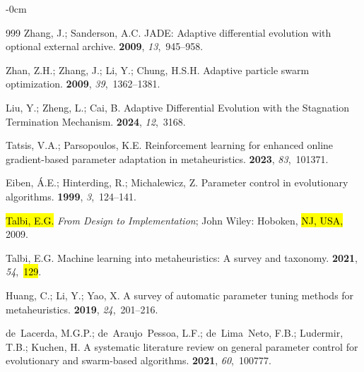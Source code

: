 \documentclass[mathematics,article,accept,moreauthors]{Definitions/mdpi}
\begin{document}
\begin{adjustwidth}{-\extralength}{0cm}
\begin{thebibliography}{999}
Zhang, J.; Sanderson, A.C.
\newblock JADE: Adaptive differential evolution with optional external archive.
 {\bf 2009}, {\em
  13},~945--958.

Zhan, Z.H.; Zhang, J.; Li, Y.; Chung, H.S.H.
\newblock Adaptive particle swarm optimization.
 {\bf 2009}, {\em 39},~1362--1381.

Liu, Y.; Zheng, L.; Cai, B.
\newblock Adaptive Differential Evolution with the Stagnation Termination
  Mechanism.
 {\bf 2024}, {\em 12},~3168.

Tatsis, V.A.; Parsopoulos, K.E.
\newblock Reinforcement learning for enhanced online gradient-based parameter
  adaptation in metaheuristics.
 {\bf 2023}, {\em
  83},~101371.

Eiben, {\'A}.E.; Hinterding, R.; Michalewicz, Z.
\newblock Parameter control in evolutionary algorithms.
 {\bf 1999}, {\em
  3},~124--141.

\hl{Talbi, E.G.} %
\newblock \textit{From Design to Implementation};
\newblock John Wiley: Hoboken, \hl{NJ, USA,} %
 2009.

Talbi, E.G.
\newblock Machine learning into metaheuristics: A survey and taxonomy.
 {\bf 2021}, {\em 54},~\hl{129}.

Huang, C.; Li, Y.; Yao, X.
\newblock A survey of automatic parameter tuning methods for metaheuristics.
 {\bf 2019}, {\em
  24},~201--216.

de~Lacerda, M.G.P.; de~Araujo~Pessoa, L.F.; de~Lima~Neto, F.B.; Ludermir, T.B.;
  Kuchen, H.
\newblock A systematic literature review on general parameter control for
  evolutionary and swarm-based algorithms.
 {\bf 2021}, {\em
  60},~100777.


\end{thebibliography}
\end{adjustwidth}
\end{document}

